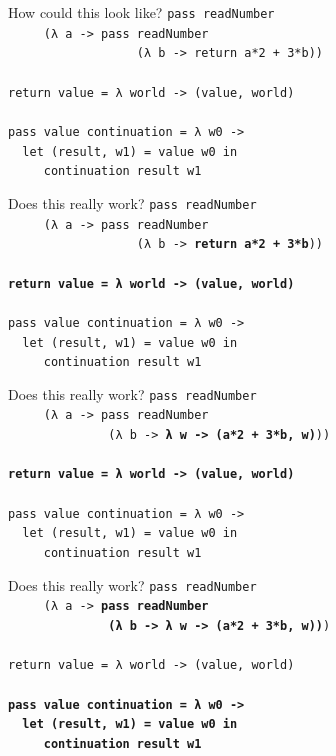 \documentclass{beamer}
\begin{document}
\begin{frame}{How could this look like?}
  \texttt{pass readNumber \\
    \ \ \ \ \ (λ a \pause -> pass readNumber \\
    \ \ \ \ \ \ \ \ \ \ \ \ \ \ \ \ \ \ (λ b \pause -> return a*2 + 3*b)) \\
    \ \\ \pause
    return value = λ world -> (value, world) \\ \pause
    \ \\
    pass value continuation = λ w0 -> \\
    \ \ let (result, w1) = value w0 in \\
    \ \ \ \ \ continuation result w1
  }
\end{frame}

\begin{frame}{Does this really work?}
  \texttt{pass readNumber\\
    \ \ \ \ \ (λ a -> pass readNumber\\
    \ \ \ \ \ \ \ \ \ \ \ \ \ \ \ \ \ \ (λ b -> \textbf{return a*2 + 3*b}))\\
    \ \\
    \textbf{return value = λ world -> (value, world)} \\
    \ \\
    pass value continuation = λ w0 -> \\
    \ \ let (result, w1) = value w0 in \\
    \ \ \ \ \ continuation result w1
  }
\end{frame}

\begin{frame}{Does this really work?}
  \texttt{pass readNumber\\
    \ \ \ \ \ (λ a -> pass readNumber\\
    \ \ \ \ \ \ \ \ \ \ \ \ \ \ (λ b -> \textbf{λ w -> (a*2 + 3*b, w)}))\\
    \ \\
    \textbf{return value = λ world -> (value, world)} \\
    \ \\
    pass value continuation = λ w0 -> \\
    \ \ let (result, w1) = value w0 in \\
    \ \ \ \ \ continuation result w1
  }
\end{frame}

\begin{frame}{Does this really work?}
  \texttt{pass readNumber\\
    \ \ \ \ \ (λ a -> \textbf{pass readNumber\\
      \ \ \ \ \ \ \ \ \ \ \ \ \ \ (λ b -> λ w -> (a*2 + 3*b, w))})\\
    \ \\
    return value = λ world -> (value, world) \\
    \ \\
    \textbf{pass value continuation = λ w0 -> \\
      \ \ let (result, w1) = value w0 in \\
      \ \ \ \ \ continuation result w1}
  }
\end{frame}
\end{document}
